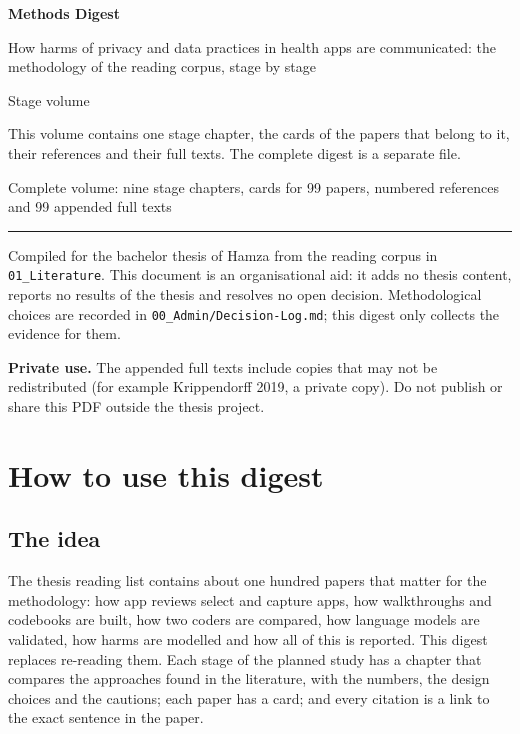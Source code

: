 \begin{titlepage}
\raggedright
{\sffamily\bfseries\Huge Methods Digest\par}
\vspace{4mm}
{\sffamily\LARGE How harms of privacy and data practices in health apps are communicated: the methodology of the reading corpus, stage by stage\par}
\vspace{10mm}
\ifdefined\onlystage
  {\sffamily\large Stage volume \textcolor{Stage\onlystage}{\textbf{\onlystage}}\par}
  \vspace{2mm}
  {\small This volume contains one stage chapter, the cards of the papers that belong to it, their references and their full texts. The complete digest is a separate file.\par}
\else
  {\sffamily\large Complete volume: nine stage chapters, cards for 99 papers, numbered references and 99 appended full texts\par}
\fi
\vspace{10mm}
\noindent\rule{\textwidth}{0.4pt}\par\medskip
{\small Compiled for the bachelor thesis of Hamza from the reading corpus in \texttt{01\_Literature}. This document is an organisational aid: it adds no thesis content, reports no results of the thesis and resolves no open decision. Methodological choices are recorded in \texttt{00\_Admin/Decision-Log.md}; this digest only collects the evidence for them.\par}
\vfill
{\small\color{black!70}\sffamily
\textbf{Private use.} The appended full texts include copies that may not be redistributed (for example Krippendorff 2019, a private copy). Do not publish or share this PDF outside the thesis project.\par}
\end{titlepage}

\tableofcontents
\clearpage
{}

\chapter*{How to use this digest}

\section*{The idea}
The thesis reading list contains about one hundred papers that matter for the methodology: how app reviews select and capture apps, how walkthroughs and codebooks are built, how two coders are compared, how language models are validated, how harms are modelled and how all of this is reported. This digest replaces re-reading them. Each stage of the planned study has a chapter that compares the approaches found in the literature, with the numbers, the design choices and the cautions; each paper has a card; and every citation is a link to the exact sentence in the paper.

